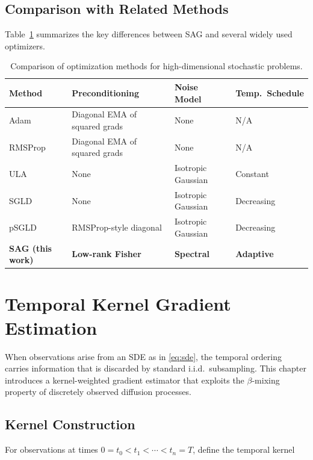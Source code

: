 \documentclass[12pt,letterpaper,twoside]{report}
\begin{document}
\section{Comparison with Related Methods}

Table~\ref{tab:comparison} summarizes the key differences between SAG and several widely used optimizers.

\begin{table}[htbp]
\centering
\caption{Comparison of optimization methods for high-dimensional stochastic problems.}
\label{tab:comparison}
\begin{tabularx}{0.92\textwidth}{lXXX}
\toprule
\textbf{Method} & \textbf{Preconditioning} & \textbf{Noise Model} & \textbf{Temp.\ Schedule} \\
\midrule
Adam \cite{kingma2014} & Diagonal EMA of squared grads & None & N/A \\
RMSProp \cite{tieleman2012} & Diagonal EMA of squared grads & None & N/A \\
ULA \cite{roberts1996} & None & Isotropic Gaussian & Constant \\
SGLD \cite{welling2011} & None & Isotropic Gaussian & Decreasing \\
pSGLD \cite{ahn2012} & RMSProp-style diagonal & Isotropic Gaussian & Decreasing \\
\textbf{SAG (this work)} & \textbf{Low-rank Fisher} & \textbf{Spectral} & \textbf{Adaptive} \\
\bottomrule
\end{tabularx}
\end{table}

\chapter{Temporal Kernel Gradient Estimation}

When observations arise from an SDE as in \eqref{eq:sde}, the temporal ordering carries information that is discarded by standard i.i.d.\ subsampling. This chapter introduces a kernel-weighted gradient estimator that exploits the $\beta$-mixing property of discretely observed diffusion processes.

\section{Kernel Construction}

For observations at times $0 = t_{0} < t_{1} < \cdots < t_{n} = T$, define the temporal kernel
\end{document}
